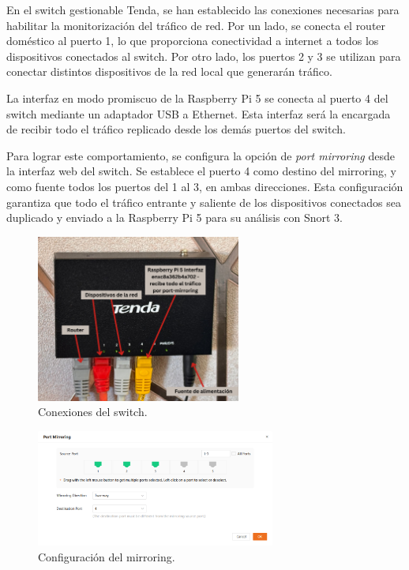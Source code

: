 \documentclass[11pt,a4paper,twoside]{report}
\begin{document}
En el switch gestionable Tenda, se han establecido las conexiones necesarias para habilitar la monitorización del tráfico de red. Por un lado, se conecta el router doméstico al puerto 1, lo que proporciona conectividad a internet a todos los dispositivos conectados al switch. Por otro lado, los puertos 2 y 3 se utilizan para conectar distintos dispositivos de la red local que generarán tráfico.\newline

La interfaz en modo promiscuo de la Raspberry Pi 5 se conecta al puerto 4 del switch mediante un adaptador USB a Ethernet. Esta interfaz será la encargada de recibir todo el tráfico replicado desde los demás puertos del switch.\newline

Para lograr este comportamiento, se configura la opción de \textit{port mirroring} desde la interfaz web del switch. Se establece el puerto 4 como destino del mirroring, y como fuente todos los puertos del 1 al 3, en ambas direcciones. Esta configuración garantiza que todo el tráfico entrante y saliente de los dispositivos conectados sea duplicado y enviado a la Raspberry Pi 5 para su análisis con Snort 3.

\begin{figure}[H]
	\centering
	\includegraphics[width=0.6\textwidth]{install/0.2.png}
	\caption{Conexiones del switch.}
	\label{fig:switch-conexiones}
\end{figure}

\begin{figure}[H]
	\centering
	\includegraphics[width=0.70\textwidth]{install/9-asignacion_port.png}
	\caption{Configuración del mirroring.}
	\label{fig:switch-mirroring}
\end{figure}
\end{document}
